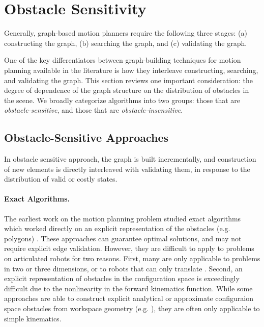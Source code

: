 \section{Obstacle Sensitivity}
\label{sec:roadmaps:sensitivity}

Generally,
graph-based motion planners require the following three stages:
(a) constructing the graph,
(b) searching the graph, and
(c) validating the graph.

One of the key differentiators between graph-building techniques
for motion planning available in the literature
is how they interleave constructing, searching, and validating
the graph.
This section reviews one important consideration:
the degree of dependence of the graph structure
on the distribution of obstacles in the scene.
We broadly categorize algorithms into two groups:
those that are \emph{obstacle-sensitive},
and those that are \emph{obstacle-insensitive}.

\subsection{Obstacle-Sensitive Approaches}
\label{subsec:roadmaps:sensitive}

In obstacle sensitive approach,
the graph is built incrementally,
and construction of new elements
is directly interleaved with validating them,
in response to the distribution of valid or costly states.

\paragraph{Exact Algorithms.}
The earliest work on the motion planning problem studied exact
algorithms which worked directly on an explicit representation
of the obstacles (e.g. polygons) \citep{lozanoperez1983cspace}.
These approaches can guarantee optimal solutions,
and may not require explicit edge validation.
However,
they are difficult to apply to problems on articulated
robots for two reasons.
First, many are only applicable to problems in two or three dimensions,
or to robots that can only translate \citep{kavraki1995cspacefft}.
Second, an explicit representation of obstacles in the
configuration space is exceedingly difficult due to the
nonlinearity in the forward kinematics function.
While some approaches are able to construct explicit
analytical or approximate configuraion space obstacles from
workspace geometry (e.g. \citep{newmanbranicky1991cspacetransforms}),
they are often only applicable to simple kinematics.

